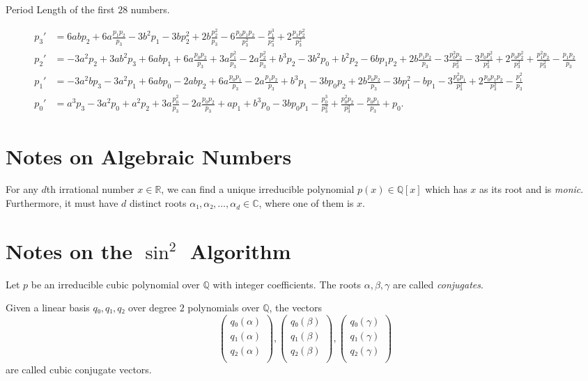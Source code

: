\begin{table}[t]
  \caption{Period Length of the first $28$ numbers.}
  \centering
  
\end{table}


\begin{align*}
    p_3' & = 6a b p_2 + 6a \frac{p_1 p_2}{p_3} - 3b^2 p_1 - 3b p_2^2 + 2b \frac{p_2^2}{p_3} - 6 \frac{p_0 p_1 p_2}{p_3^2} - \frac{p_1^3}{p_3^2} + 2 \frac{p_1 p_2^2}{p_3^2} \\
    p_2' & = -3a^2 p_2 + 3a b^2 p_3 + 6a b p_1 + 6a \frac{p_0 p_2}{p_3} + 3a \frac{p_1^2}{p_3} - 2a \frac{p_2^2}{p_3} + b^3 p_2 - 3b^2 p_0 + b^2 p_2 - 6b p_1 p_2 + 2b \frac{p_1 p_2}{p_3} - 3 \frac{p_0^2 p_2}{p_3^2} - 3 \frac{p_0 p_1^2}{p_3^2} + 2 \frac{p_0 p_2^2}{p_3^2} + \frac{p_1^2 p_2}{p_3^2} - \frac{p_1 p_2}{p_3} \\
  p_1' & = -3a^2 b p_3 - 3a^2 p_1 + 6a b p_0 - 2a b p_2 + 6a \frac{p_0 p_1}{p_3} - 2a \frac{p_1 p_2}{p_3} + b^3 p_1 - 3b p_0 p_2 + 2b \frac{p_0 p_2}{p_3} - 3b p_1^2 - b p_1 - 3 \frac{p_0^2 p_1}{p_3^2} + 2 \frac{p_0 p_1 p_2}{p_3^2} - \frac{p_1^2}{p_3} \\
  p_0' & = a^3 p_3 - 3a^2 p_0 + a^2 p_2 + 3a \frac{p_0^2}{p_3} - 2a \frac{p_0 p_2}{p_3} + a p_1 + b^3 p_0 - 3b p_0 p_1 - \frac{p_0^3}{p_3^2} + \frac{p_0^2 p_2}{p_3^2} - \frac{p_0 p_1}{p_3} + p_0.
\end{align*}


\section{Notes on Algebraic Numbers}

For any $d$th irrational number $x ∈ ℝ$, we can find a unique irreducible polynomial $p(x) ∈ ℚ[x]$
which has $x$ as its root and is \emph{monic}.
Furthermore, it must have $d$ distinct roots $α₁, α₂, \dots, α_d ∈ ℂ$,
where one of them is $x$.

\section{Notes on the $\sin^2$ Algorithm}

Let $p$ be an irreducible cubic polynomial over $ℚ$ with integer coefficients.
The roots $α, β, γ$ are called \emph{conjugates}.

Given a linear basis $q₀, q₁, q₂$ over degree $2$ polynomials over $ℚ$,
the vectors
\[
  \begin{pmatrix}
    q₀(α) \\
    q₁(α) \\
    q₂(α) \\
  \end{pmatrix},
  \begin{pmatrix}
    q₀(β) \\
    q₁(β) \\
    q₂(β) \\
  \end{pmatrix},
  \begin{pmatrix}
    q₀(γ) \\
    q₁(γ) \\
    q₂(γ) \\
  \end{pmatrix}
\]
are called cubic conjugate vectors.

